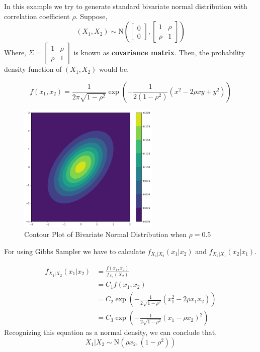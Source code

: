 \begin{example}

    In this example we try to generate standard bivariate normal distribution with correlation coefficient $ \rho $. Suppose,
    \[
        (X_1, X_2) \sim \text{N}\left(  
            \begin{bmatrix}
                0\\
                0
            \end{bmatrix},
            \begin{bmatrix}
                1 & \rho \\ 
                \rho & 1
            \end{bmatrix}
        \right)
    \]
    Where, $ \Sigma = \begin{bmatrix}
        1 & \rho \\ 
        \rho & 1
    \end{bmatrix} $ is known as \textbf{covariance matrix}.  Then, the probability density function of $ (X_1,X_2) $ would be,

    \[
        f(x_1,x_2) = \frac{1}{2 \pi \sqrt{1-\rho^2}} \exp \left( - \frac{1}{2(1-\rho^2)} (x^2 -2 \rho xy + y^2  ) \right)
    \]
    
    \begin{figure}[H]
        \centering
        \includegraphics[width=0.6\textwidth]{images/gibbs/example1/con-plot.png}
        \caption{Contour Plot of Bivariate Normal Distribution when $ \rho = 0.5 $}
    \end{figure}

    For using Gibbs Sampler we have to calculate $ f_{X_1|X_2}(x_1|x_2) $ and $ f_{X_2|X_1}(x_2|x_1) $.

    \begin{align*}
        f_{X_1|X_2}(x_1|x_2) &= \frac{f(x_1,x_2)}{f_{X_2}(X_2)} \\ 
                    &=C_1 f(x_1,x_2) \\
                    &=C_2 \exp \left( - \frac{1}{2 \sqrt{1-\rho^2}} (x_1^2 - 2 \rho x_1x_2) \right) \\
                    &= C_3 \exp \left(- \frac{1}{2 \sqrt{1-\rho^2}} (x_1 - \rho x_2)^2   \right)
    \end{align*}
     Recognizing this equation as a normal density, we can conclude that, 
     \[ X_1|X_2 \sim \text{N}(\rho x_2, (1-\rho^2)) \]


\end{example}
